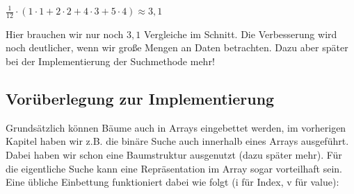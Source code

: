 \documentclass{article}
\begin{document}
\begin{center}
    $\frac{1}{12} \cdot (1\cdot 1+ 2\cdot 2+4\cdot 3 + 5\cdot 4) \approx 3,1$
\end{center}
Hier brauchen wir nur noch $3,1$ Vergleiche im Schnitt. Die Verbesserung wird noch deutlicher, wenn wir große Mengen an Daten betrachten. Dazu aber später bei der Implementierung der Suchmethode mehr! \\

\subsection{Vorüberlegung zur Implementierung}
Grundsätzlich können Bäume auch in Arrays eingebettet werden, im vorherigen Kapitel haben wir z.B. die binäre Suche auch innerhalb eines Arrays ausgeführt. Dabei haben wir schon eine Baumstruktur ausgenutzt (dazu später mehr). Für die eigentliche Suche kann eine Repräsentation im Array sogar vorteilhaft sein. Eine übliche Einbettung funktioniert dabei wie folgt (i für Index, v für value):
\end{document}
